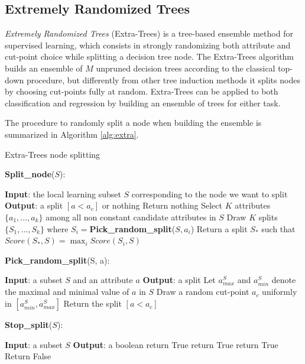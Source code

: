  
\subsection{Extremely Randomized Trees}\label{s:extra-trees}
\textit{Extremely Randomized Trees} (Extra-Trees) \cite{geurts2006extremely}
is a tree-based ensemble method for supervised learning, which consists in 
strongly randomizing both attribute and cut-point choice while splitting a 
decision tree node. 
The Extra-Trees algorithm builds an ensemble of $M$ unpruned decision trees 
according to the classical top-down procedure, but differently from other tree 
induction methods it splits nodes by choosing cut-points fully at random. 
Extra-Trees can be applied to both classification and regression by building 
an ensemble of trees for either task.

The procedure to randomly split a node when building the ensemble is summarized 
in Algorithm \ref{alg:extra}.
%
\begin{algorithm}
    \caption{Extra-Trees node splitting}
    \label{alg:extra}
    \begin{algorithmic}
	\STATE \textbf{Split\_node}($S$):
	    \begin{ALC@g}
		\STATE \textbf{Input}: the local learning subset $S$ corresponding to the node we want to split
		\STATE \textbf{Output}: a split $[a < a_c]$ or nothing
		    \STATE Return nothing
		\ELSE{} 
		    \STATE Select $K$ attributes $\{a_1, ..., a_k\}$ among all non constant candidate attributes in $S$
		    \STATE Draw $K$ splits $\{S_1, ..., S_k\}$ where $S_i=$\textbf{Pick\_random\_split}($S, a_i$)
		    \STATE Return a split $S_*$ such that $Score(S_*, S)=\max_{i}Score(S_i, S)$
		\ENDIF
	    \end{ALC@g}
	\STATE
	\STATE \textbf{Pick\_random\_split}(S, a):
	    \begin{ALC@g}
		\STATE \textbf{Input}: a subset $S$ and an attribute $a$
		\STATE \textbf{Output}: a split
		\STATE Let $a_{max}^S$ and $a_{min}^S$ denote the maximal and minimal value of $a$ in $S$
		\STATE Draw a random cut-point $a_c$ uniformly in $[a_{min}^S, a_{max}^S]$
		\STATE Return the split $[a < a_c]$
	    \end{ALC@g}
	\STATE
	\STATE \textbf{Stop\_split}($S$):
	    \begin{ALC@g}
		\STATE \textbf{Input}: a subset $S$
		\STATE \textbf{Output}: a boolean
		 \STATE return True \ENDIF
		 \STATE return True \ENDIF
		 \STATE return True \ENDIF
		\STATE Return False
	    \end{ALC@g}
    \end{algorithmic}
\end{algorithm}
%

